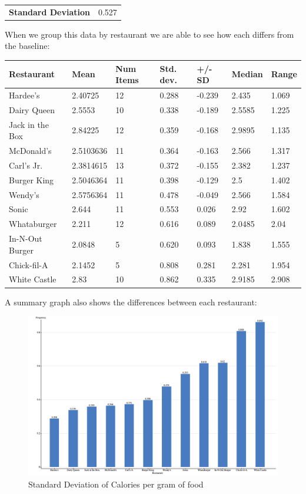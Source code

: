 \documentclass[12pt,fleqn]{article}
\newcommand{\thead}[1]{\textnormal{\textbf{#1}}}
\begin{document}
  \begin{tabular}{@{}ll@{}}
    \textbf{Standard Deviation} & 0.527 \\
  \end{tabular}
  \vspace{.25cm}

When we group this data by restaurant we are able to see how each differs from the baseline:

  \vspace{.25cm}
  \begin{tabular}{@{}lllllll@{}}
    \thead{Restaurant} & \thead{Mean} & \thead{Num Items} & \thead{Std. dev.} & \thead{+/- SD} & \thead{Median} & \thead{Range}  \\
  \toprule
  Hardee's	    & 2.40725	& 12	& 0.288 & -0.239        & 2.435	 & 1.069 \\
  Dairy Queen	    & 2.5553	& 10	& 0.338 & -0.189	& 2.5585 & 1.225 \\
  Jack in the Box & 2.84225	& 12	& 0.359 & -0.168	& 2.9895 & 1.135 \\
  McDonald's	    & 2.5103636	& 11	& 0.364 & -0.163	& 2.566	 & 1.317 \\
  Carl's Jr.	    & 2.3814615	& 13	& 0.372 & -0.155	& 2.382	 & 1.237 \\
  Burger King	    & 2.5046364	& 11	& 0.398 & -0.129	& 2.5	 & 1.402 \\
  Wendy's	    & 2.5756364	& 11	& 0.478 & -0.049	& 2.566	 & 1.584 \\
  Sonic	    & 2.644	& 11	& 0.553 & 0.026	& 2.92	 & 1.602 \\
  Whataburger	    & 2.211	& 12	& 0.616 & 0.089	& 2.0485 & 2.04  \\
  In-N-Out Burger & 2.0848	& 5	& 0.620 & 0.093	& 1.838	 & 1.555 \\
  Chick-fil-A	    & 2.1452	& 5	& 0.808 & 0.281	& 2.281	 & 1.954 \\
  White Castle    & 2.83	& 10	& 0.862 & 0.335	& 2.9185 & 2.908 \\
  \bottomrule
\end{tabular}
\vspace{.25cm}

A summary graph also shows the differences between each restaurant:
\begin{figure}[ht]
  \includegraphics[width=6in]{assets/std-dev-restaurants.png}
  \caption{Standard Deviation of Calories per gram of food}
\end{figure}
\end{document}
